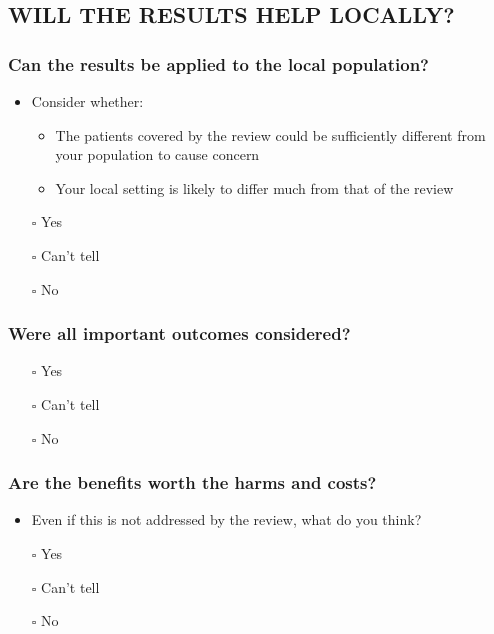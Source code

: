 \documentclass[
  doc, a4paper]{apa7}
\providecommand{\tightlist}{%
  \setlength{\itemsep}{0pt}\setlength{\parskip}{0pt}}
\begin{document}
\subsection{WILL THE RESULTS HELP LOCALLY?}\label{will-the-results-help-locally}

\subsubsection{Can the results be applied to the local population?}\label{can-the-results-be-applied-to-the-local-population}

\begin{itemize}
\tightlist
\item
  Consider whether:

  \begin{itemize}
  \tightlist
  \item
    The patients covered by the review could be sufficiently different from your population to cause concern
  \item
    Your local setting is likely to differ much from that of the review
  \end{itemize}
\item[$\square$]
  Yes
\item[$\square$]
  Can't tell
\item[$\square$]
  No
\end{itemize}

\subsubsection{Were all important outcomes considered?}\label{were-all-important-outcomes-considered}

\begin{itemize}
\tightlist
\item[$\square$]
  Yes
\item[$\square$]
  Can't tell
\item[$\square$]
  No
\end{itemize}

\subsubsection{Are the benefits worth the harms and costs?}\label{are-the-benefits-worth-the-harms-and-costs}

\begin{itemize}
\tightlist
\item
  Even if this is not addressed by the review, what do you think?
\item[$\square$]
  Yes
\item[$\square$]
  Can't tell
\item[$\square$]
  No
\end{itemize}
\end{document}
